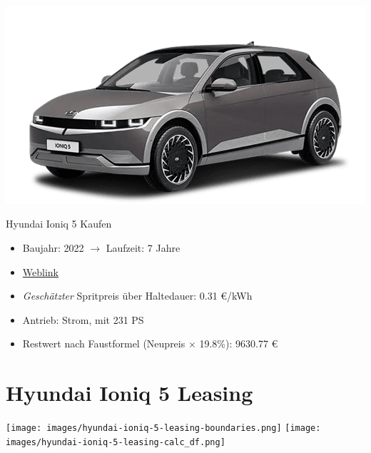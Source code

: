 \documentclass[landscape, DIV=99, 14pt]{scrartcl}
\begin{document}
\pagebreak
\null
\vspace{2cm}
\begin{center}
\includegraphics[width=0.9\columnwidth]{cars/hyundai-ioniq-5.png}

Hyundai Ioniq 5 Kaufen
\end{center}

\begin{itemize}
    \item Baujahr: 2022 $\rightarrow$ Laufzeit: 7 Jahre
    \item \href{https://konfigurator.meinauto.de/hyundai/neuwagen/ioniq/angebote/ioniq-5/konfigurator/\#!/extras/-/8865700/14,19,41/private/104690-6897-293274/4864/61e90b0c48e55/cash-purchase/104690-6897-293274/24,9000,15000,0,0,0,0,0,}{Weblink}
    \item \emph{Gesch\"atzter} Spritpreis \"uber Haltedauer: 0.31 \euro{}/kWh
    \item Antrieb: Strom, mit 231 PS
    \item Restwert nach Faustformel (Neupreis $\times$ 19.8\%): 9630.77 \euro{}
\end{itemize}

\pagebreak


\twocolumn

\section*{Hyundai Ioniq 5 Leasing}
\begin{center}
\texttt{[image: images/hyundai-ioniq-5-leasing-boundaries.png]}
\null
\vspace{0.5cm}
\texttt{[image: images/hyundai-ioniq-5-leasing-calc\_df.png]}
\end{center}
\end{document}

